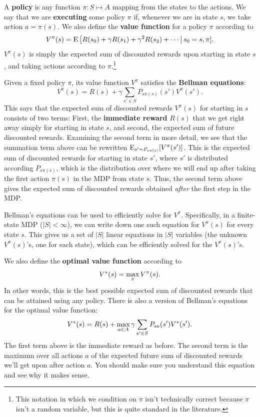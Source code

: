 \documentclass{article}
\begin{document}
A {\bf policy} is any function $\pi: S \mapsto A$ mapping from the states to the
actions.  We say that we are {\bf executing} some policy $\pi$ if, whenever we are
in state $s$, we take action $a = \pi(s)$.  We also define the {\bf value function}
for a policy $\pi$ according to
\[
V^\pi(s) =
{\rm E}\left[R(s_0) + \gamma R(s_1) + \gamma^2 R(s_2) + \cdots\right | s_0 = s, \pi].
\]
$V^\pi(s)$ is simply the expected sum of discounted rewards upon starting
in state $s$, and taking actions according to $\pi$.\footnote{This notation
in which we condition on $\pi$ isn't technically correct because $\pi$ isn't
a random variable, but this is quite standard in the literature.}

Given a fixed policy $\pi$, its value function $V^\pi$ satisfies the
{\bf Bellman equations}:
\[
V^\pi(s) = R(s) + \gamma \sum_{s' \in S} P_{s\pi(s)}(s')V^\pi(s').
\]
This says that the expected sum of discounted rewards $V^\pi(s)$ for
starting in $s$ consists of two terms: First, the {\bf immediate reward}
$R(s)$ that we get right away simply for starting in state $s$, and second,
the expected sum of future discounted rewards.  Examining the second term
in more detail, we see that the summation term above can be rewritten
${\rm E}_{s' \sim P_{s\pi(s)}}[ V^\pi(s')]$.  This is the expected sum of
discounted rewards for starting in state $s'$, where $s'$ is distributed
according $P_{s\pi(s)}$, which is the distribution over where we will end
up after taking the first action $\pi(s)$ in the MDP from state $s$.
Thus, the second term above gives the expected sum of discounted rewards
obtained \emph{after} the first step in the MDP.

Bellman's equations can be used to efficiently solve for $V^\pi$.  Specifically,
in a finite-state MDP ($|S| < \infty$), we can write down one such equation
for $V^\pi(s)$ for every state $s$.  This gives us a set of $|S|$ linear
equations in $|S|$ variables (the unknown $V^\pi(s)$'s, one for each state), which
can be efficiently solved for the $V^\pi(s)$'s.

We also define the {\bf optimal value function} according to
\begin{equation}
{V^{\ast}}(s) = \max_{\pi} V^\pi(s).
\label{eqn-vstar}
\end{equation}
In other words, this is the best possible expected sum of discounted rewards
that can be attained using any policy.  There is also a version of Bellman's
equations for the optimal value function:
\begin{equation}
{V^{\ast}}(s) = R(s) + \max_{a \in A} \gamma \sum_{s'\in S} P_{sa}(s'){V^{\ast}}(s').
\label{eqn-optbellman}
\end{equation}
The first term above is the immediate reward as before.  The second term is
the maximum over all actions $a$ of the expected future sum of discounted
rewards we'll get upon after action $a$.  You should make sure you understand
this equation and see why it makes sense.
\end{document}
